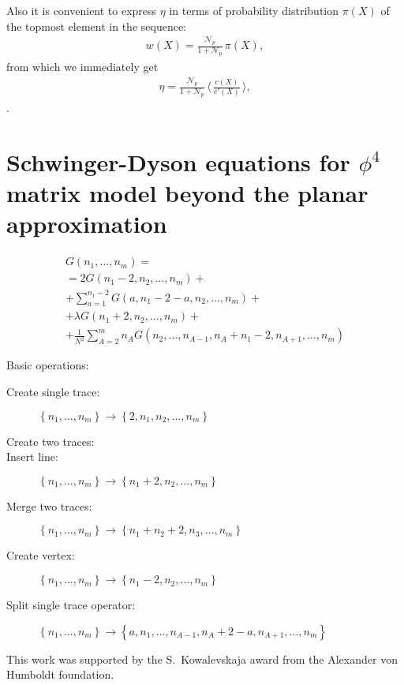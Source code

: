 \documentclass[twocolumn,showpacs,preprintnumbers,superscriptaddress,amsmath,floatfix,amssymb,secnumarabic]{revtex4}
\newcommand{\lr}[1]{ \left( #1 \right) }
\newcommand{\lrc}[1]{ \left\{ #1 \right\} }
\newcommand{\vev}[1]{ \langle \, #1 \, \rangle }
\begin{document}
Also it is convenient to express $\eta$ in terms of probability distribution $\pi\lr{X}$ of the topmost element in the sequence:
\begin{eqnarray}
\label{topmost_distrib}
 w\lr{X} = \frac{\mathcal{N}_p}{1 + \mathcal{N}_p} \, \pi\lr{X} ,
\end{eqnarray}
from which we immediately get
\begin{eqnarray}
\label{topmost_distrib}
 \eta = \frac{\mathcal{N}_p}{1 + \mathcal{N}_p} \, \vev{ \frac{c\lr{X}}{c'\lr{X}} } ,
\end{eqnarray} .

\section{Schwinger-Dyson equations for $\phi^4$ matrix model beyond the planar approximation}
\label{sec:phi4sd_nonplanar}

\begin{eqnarray}
\label{phi4sd_nonplanar}
 G\lr{n_1, \ldots, n_m}
 = \nonumber \\ =
 2 G\lr{n_1 - 2, n_2, \ldots, n_m}
 + \nonumber \\ +
 \sum\limits_{a=1}^{n_1-2}
 G\lr{a, n_1 - 2 - a, n_2, \ldots, n_m}
 + \nonumber \\ +
 \lambda G\lr{n_1 + 2, n_2, \ldots, n_m}
 + \nonumber \\ +
 \frac{1}{N^2} \sum\limits_{A=2}^{m} n_A
 G\lr{n_2, \ldots, n_{A-1}, n_A + n_1 - 2, n_{A+1}, \ldots, n_m}
\end{eqnarray}

Basic operations:
\begin{description}
  \item[Create single trace:] $\lrc{n_1, \ldots, n_m} \rightarrow \lrc{2, n_1, n_2, \ldots, n_m}$
  \item[Create two traces:]
  \item[Insert line:] $\lrc{n_1, \ldots, n_m} \rightarrow \lrc{n_1 + 2, n_2, \ldots, n_m}$
  \item[Merge two traces:] $\lrc{n_1, \ldots, n_m} \rightarrow \lrc{n_1 + n_2 + 2, n_3, \ldots, n_m}$
  \item[Create vertex:] $\lrc{n_1, \ldots, n_m} \rightarrow \lrc{n_1 - 2, n_2, \ldots, n_m}$
  \item[Split single trace operator:] $\lrc{n_1, \ldots, n_m} \rightarrow \lrc{a, n_1, \ldots, n_{A-1}, n_A + 2 - a, n_{A+1}, \ldots, n_m}$
\end{description}

\begin{acknowledgments}
 This work was supported by the S.~Kowalevskaja award from the Alexander von Humboldt foundation.
\end{acknowledgments}



\end{document}
